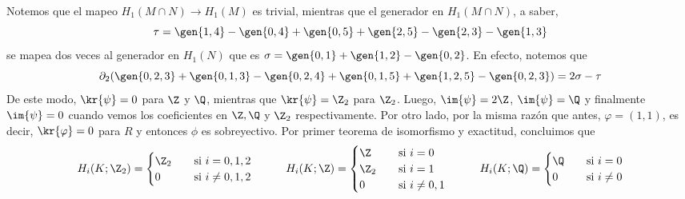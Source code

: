 \documentclass{article}
\begin{document}
\begin{enumerate}
    \vspace{2mm}
    \centerline{
    }
    \vspace{1mm}
    Notemos que el mapeo $H_{1}(M\cap N)\to H_{1}(M)$ es trivial, mientras que el generador en 
    $H_{1}(M\cap N)$, a saber,
    \begin{equation*}
        \tau=\gen{1,4}-\gen{0,4}+\gen{0,5}+\gen{2,5}-\gen{2,3}-\gen{1,3}
    \end{equation*}
    se mapea dos veces al generador en $H_{1}(N)$ que es $\sigma=\gen{0,1}+\gen{1,2}-\gen{0,2}$.
    En efecto, notemos que
    \begin{equation*}
        \partial_{2}(\gen{0,2,3}+\gen{0,1,3}-\gen{0,2,4}+\gen{0,1,5}+\gen{1,2,5}-\gen{0,2,3})=
        2\sigma-\tau
    \end{equation*}
    De este modo, $\kr{\psi}=0$ para $\Z$ y $\Q$, mientras que $\kr{\psi}=\Z_{2}$ para $\Z_{2}$.
    Luego, $\im{\psi}=2\Z$, $\im{\psi}=\Q$ y finalmente $\im{\psi}=0$ cuando vemos los 
    coeficientes en $\Z,\Q$ y $\Z_{2}$ respectivamente. Por otro lado, por la misma razón que 
    antes, $\varphi=(1,1)$, es decir, $\kr{\varphi}=0$ para $R$ y entonces $\phi$ es sobreyectivo. 
    Por primer teorema de isomorfismo y exactitud, concluimos que
    \begin{equation*}
        H_{i}(K;\Z_{2})=\begin{cases}
            \Z_{2} &\quad\text{si }i=0,1,2 \\
            0 &\quad\text{si }i\neq0,1,2
        \end{cases}
        \hspace{1cm}
        H_{i}(K;\Z)=\begin{cases}
            \Z & \quad\text{si }i=0 \\
            \Z_{2} & \quad\text{si }i=1 \\
            0 & \quad\text{si }i\neq0,1
        \end{cases}
        \hspace{1cm}
        H_{i}(K;\Q)=\begin{cases}
            \Q & \quad\text{si }i=0 \\
            0 & \quad\text{si }i\neq0
        \end{cases}
    \end{equation*}
\end{enumerate}
\end{document}
